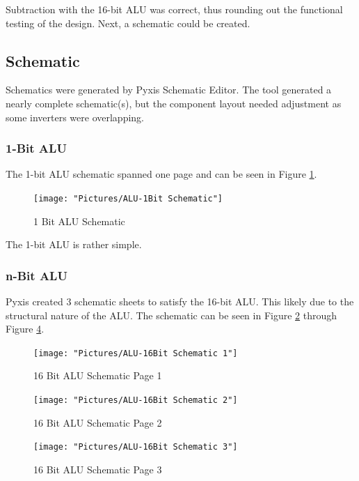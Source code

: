 \documentclass[11pt]{article}
\begin{document}
			Subtraction with the 16-bit ALU was correct, thus rounding out the functional testing of the design. Next, a schematic could be created.

	\subsection{Schematic}
	
		Schematics were generated by Pyxis Schematic Editor. The tool generated a nearly complete schematic(s), but the component layout needed adjustment as some inverters were overlapping. 

		\subsubsection{1-Bit ALU}	
		
			The 1-bit ALU schematic spanned one page and can be seen in Figure \ref{fig:alu-1bit-schematic}. 
			
			\begin{figure}[H]
				\centering
				\texttt{[image: "Pictures/ALU-1Bit Schematic"]}
				\caption{1 Bit ALU Schematic}
				\label{fig:alu-1bit-schematic}
			\end{figure}
		
			The 1-bit ALU is rather simple.		

		\subsubsection{n-Bit ALU}
		
			Pyxis created 3 schematic sheets to satisfy the 16-bit ALU. This likely due to the structural nature of the ALU. The schematic can be seen in Figure \ref{fig:alu-16bit-schematic-1} through Figure \ref{fig:alu-16bit-schematic-3}.
			
			
			\begin{figure}[H]
				\centering
				\texttt{[image: "Pictures/ALU-16Bit Schematic 1"]}
				\caption{16 Bit ALU Schematic Page 1}
				\label{fig:alu-16bit-schematic-1}
			\end{figure}
		
			\begin{figure}[H]
				\centering
				\texttt{[image: "Pictures/ALU-16Bit Schematic 2"]}
				\caption{16 Bit ALU Schematic Page 2}
				\label{fig:alu-16bit-schematic-2}
			\end{figure}
		
			\begin{figure}[H]
				\centering
				\texttt{[image: "Pictures/ALU-16Bit Schematic 3"]}
				\caption{16 Bit ALU Schematic Page 3}
				\label{fig:alu-16bit-schematic-3}
			\end{figure}
\end{document}
